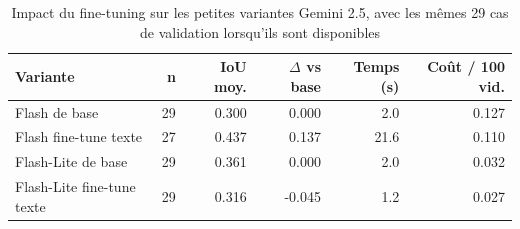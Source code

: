 \begin{table}[ht]
\centering
\footnotesize
\caption{Impact du fine-tuning sur les petites variantes Gemini 2.5, avec les m\^emes 29 cas de validation lorsqu'ils sont disponibles}
\label{tab:llm-small-finetuning}
\begin{tabularx}{\textwidth}{>{\raggedright\arraybackslash}Xrrrrr}
\toprule
Variante & n & IoU moy. & $\Delta$ vs base & Temps (s) & Co\^ut / 100 vid. \\
\midrule
Flash de base & 29 & 0.300 & 0.000 & 2.0 & 0.127 \\
Flash fine-tune texte & 27 & 0.437 & 0.137 & 21.6 & 0.110 \\
Flash-Lite de base & 29 & 0.361 & 0.000 & 2.0 & 0.032 \\
Flash-Lite fine-tune texte & 29 & 0.316 & -0.045 & 1.2 & 0.027 \\
\bottomrule
\end{tabularx}
\end{table}
